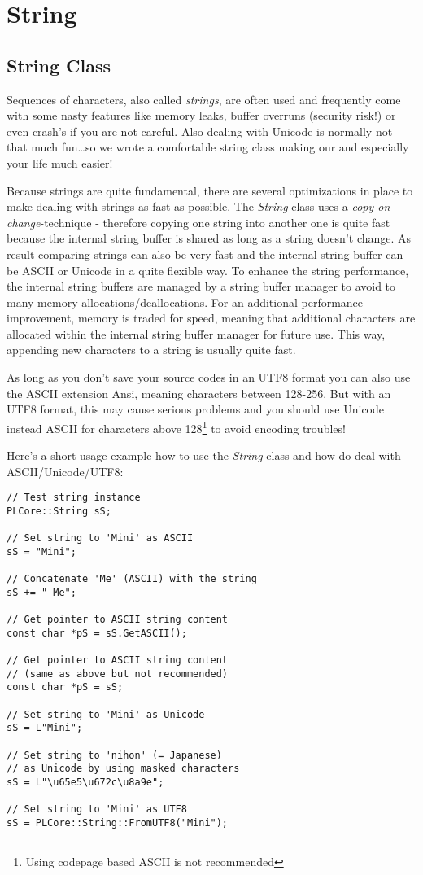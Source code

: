 \section{String}




\subsection{String Class}
Sequences of characters, also called \emph{strings}, are often used and frequently come with some nasty features like memory leaks, buffer overruns (security risk!) or even crash's if you are not careful. Also dealing with Unicode is normally not that much fun\ldots so we wrote a comfortable string class making our and especially your life much easier!

Because strings are quite fundamental, there are several optimizations in place to make dealing with strings as fast as possible. The \emph{String}-class uses a \emph{copy on change}-technique - therefore copying one string into another one is quite fast because the internal string buffer is shared as long as a string doesn't change. As result comparing strings can also be very fast and the internal string buffer can be \ac{ASCII} or Unicode in a quite flexible way. To enhance the string performance, the internal string buffers are managed by a string buffer manager to avoid to many memory allocations/deallocations. For an additional performance improvement, memory is traded for speed, meaning that additional characters are allocated within the internal string buffer manager for future use. This way, appending new characters to a string is usually quite fast.

As long as you don't save your source codes in an UTF8 format you can also use the \ac{ASCII} extension Ansi, meaning characters between 128-256. But with an UTF8 format, this may cause serious problems and you should use Unicode instead \ac{ASCII} for characters above 128\footnote{Using codepage based \ac{ASCII} is not recommended} to avoid encoding troubles!

Here's a short usage example how to use the \emph{String}-class and how do deal with \ac{ASCII}/Unicode/UTF8:

\begin{lstlisting}[caption=\ac{ASCII}/Unicode/UTF8 string example]
// Test string instance
PLCore::String sS;

// Set string to 'Mini' as ASCII
sS = "Mini";

// Concatenate 'Me' (ASCII) with the string
sS += " Me";

// Get pointer to ASCII string content
const char *pS = sS.GetASCII();

// Get pointer to ASCII string content
// (same as above but not recommended)
const char *pS = sS;

// Set string to 'Mini' as Unicode
sS = L"Mini";

// Set string to 'nihon' (= Japanese)
// as Unicode by using masked characters
sS = L"\u65e5\u672c\u8a9e";

// Set string to 'Mini' as UTF8
sS = PLCore::String::FromUTF8("Mini");
\end{lstlisting}


